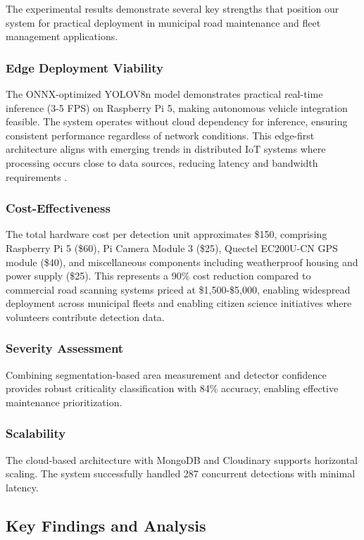 \documentclass{ieeeaccess}
\begin{document}
The experimental results demonstrate several key strengths that position our system for practical deployment in municipal road maintenance and fleet management applications.

\subsubsection{Edge Deployment Viability}
The ONNX-optimized YOLOV8n model demonstrates practical real-time inference (3-5 FPS) on Raspberry Pi 5, making autonomous vehicle integration feasible. The system operates without cloud dependency for inference, ensuring consistent performance regardless of network conditions. This edge-first architecture aligns with emerging trends in distributed IoT systems where processing occurs close to data sources, reducing latency and bandwidth requirements \cite{b9, b11}.

\subsubsection{Cost-Effectiveness}
The total hardware cost per detection unit approximates \$150, comprising Raspberry Pi 5 (\$60), Pi Camera Module 3 (\$25), Quectel EC200U-CN GPS module (\$40), and miscellaneous components including weatherproof housing and power supply (\$25). This represents a 90\% cost reduction compared to commercial road scanning systems priced at \$1,500-\$5,000, enabling widespread deployment across municipal fleets and enabling citizen science initiatives where volunteers contribute detection data.

\subsubsection{Severity Assessment}
Combining segmentation-based area measurement and detector confidence provides robust criticality classification with 84\% accuracy, enabling effective maintenance prioritization.

\subsubsection{Scalability}
The cloud-based architecture with MongoDB and Cloudinary supports horizontal scaling. The system successfully handled 287 concurrent detections with minimal latency.

\subsection{Key Findings and Analysis}
\end{document}
